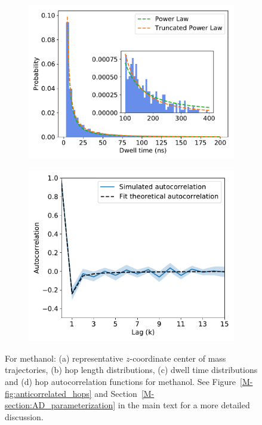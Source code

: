 \documentclass{article}
\begin{document}
\begin{figure}
  \begin{subfigure}{0.45\textwidth}
  \includegraphics[width=\textwidth]{MET_powerlaw.pdf}
  \caption{}\label{fig:MET_powerlaw}
  \end{subfigure}
  \begin{subfigure}{0.45\textwidth}
  \includegraphics[width=\textwidth]{MET_hop_acf.pdf}
  \caption{}\label{fig:MET_hop_acf}
  \end{subfigure}
  \caption{For methanol: (a) representative $z$-coordinate center of mass trajectories, (b) hop 
  length distributions, (c) dwell time distributions and (d) hop autocorrelation functions
  for methanol. See Figure~\ref{M-fig:anticorrelated_hops} and Section~\ref{M-section:AD_parameterization}
  in the main text for a more detailed discussion.}\label{fig:MET_anticorrelated_hops}
  \end{figure}
  
\end{document}
